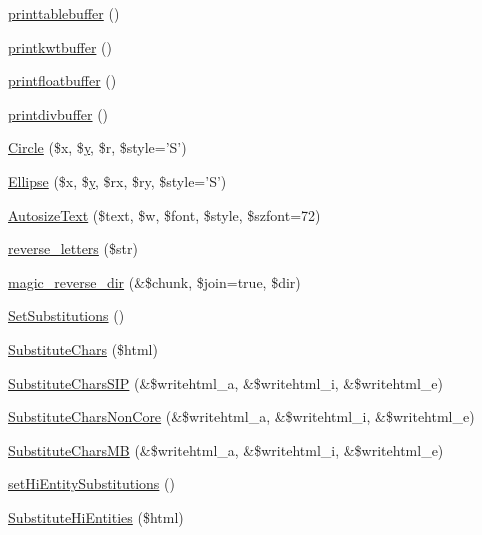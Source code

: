 \begin{DoxyCompactItemize}
\item 
\hyperlink{classm_p_d_f_a49b1d20c88509ba51e5a7bd0337bd3fc}{printtablebuffer} ()
\item 
\hyperlink{classm_p_d_f_a66c8db0c2362711d1cdb8711360754ff}{printkwtbuffer} ()
\item 
\hyperlink{classm_p_d_f_a83140b0a9ec7f7b9b2825c37f71062a1}{printfloatbuffer} ()
\item 
\hyperlink{classm_p_d_f_ad8ec1b14efa182f7a022d3adeadef8e6}{printdivbuffer} ()
\item 
\hyperlink{classm_p_d_f_a35b808f4e503ec997dedc5223b75758f}{Circle} (\$x, \$\hyperlink{example43___m_p_d_f_i__booklet_8php_a3f83be162d14f38451e1bc419fbbbcbc}{y}, \$r, \$style='S')
\item 
\hyperlink{classm_p_d_f_abdbbf5e1c8fac41b5fc13392223bc3cf}{Ellipse} (\$x, \$\hyperlink{example43___m_p_d_f_i__booklet_8php_a3f83be162d14f38451e1bc419fbbbcbc}{y}, \$rx, \$ry, \$style='S')
\item 
\hyperlink{classm_p_d_f_a12a2e783e6ecb9c88c0b4c63a83e7f8f}{Autosize\-Text} (\$text, \$w, \$font, \$style, \$szfont=72)
\item 
\hyperlink{classm_p_d_f_a0ad68897d0d323954f5ebc04e7b8a9c8}{reverse\-\_\-letters} (\$str)
\item 
\hyperlink{classm_p_d_f_ab80c183ebb8393123fb97eddd1472bd1}{magic\-\_\-reverse\-\_\-dir} (\&\$chunk, \$join=true, \$dir)
\item 
\hyperlink{classm_p_d_f_ab953e8ae6da59b89132497ae8d730854}{Set\-Substitutions} ()
\item 
\hyperlink{classm_p_d_f_aa29af7c5ae42fd59368e5292b3d928bd}{Substitute\-Chars} (\$html)
\item 
\hyperlink{classm_p_d_f_a90c3df5d44f4974475557e26166617d4}{Substitute\-Chars\-S\-I\-P} (\&\$writehtml\-\_\-a, \&\$writehtml\-\_\-i, \&\$writehtml\-\_\-e)
\item 
\hyperlink{classm_p_d_f_aeacc3fd42c0afbb7240c1e9d088cb109}{Substitute\-Chars\-Non\-Core} (\&\$writehtml\-\_\-a, \&\$writehtml\-\_\-i, \&\$writehtml\-\_\-e)
\item 
\hyperlink{classm_p_d_f_a5a486034d8a469787151eac29021af26}{Substitute\-Chars\-M\-B} (\&\$writehtml\-\_\-a, \&\$writehtml\-\_\-i, \&\$writehtml\-\_\-e)
\item 
\hyperlink{classm_p_d_f_adfb4b9fcb52fff3b602a10b71c6ca84e}{set\-Hi\-Entity\-Substitutions} ()
\item 
\hyperlink{classm_p_d_f_a110f18dbc6b15e312ba7997eca4af65d}{Substitute\-Hi\-Entities} (\$html)
\item 

\end{DoxyCompactItemize}
